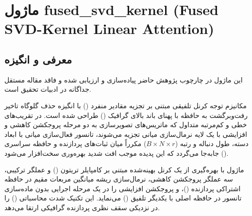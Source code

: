 \section{ماژول fused\_svd\_kernel (Fused SVD-Kernel Linear Attention)}
\label{sec:module_fused_svd_kernel}

\subsection{معرفی و انگیزه}
این ماژول در چارچوب پژوهش حاضر پیاده‌سازی و ارزیابی شده و فاقد مقاله مستقل جداگانه در ادبیات تحقیق است.

مکانیزم توجه کرنل تلفیقی مبتنی بر تجزیه مقادیر منفرد () با انگیزه حذف گلوگاه تاخیر رفت‌وبرگشت به حافظه با پهنای باند بالای گرافیک () طراحی شده است. در تقریب‌های خطی و کم‌مرتبه متداول که ماتریس‌های تصویرسازی به دو مرحله پروجکشن کاهشی و افزایشی با یک لایه نرمال‌سازی میانی تجزیه می‌شوند، تانسور فعال‌سازی میانی با ابعاد دسته، طول دنباله و رتبه ($B \times N \times r$) مکرراً میان ثبات‌های پردازنده و حافظه سراسری () جابه‌جا می‌گردد که این پدیده موجب افت شدید بهره‌وری سخت‌افزار می‌شود.

ماژول  با بهره‌گیری از یک کرنل بهینه‌شده مبتنی بر کامپایلر تریتون () و عملگر ترکیبی، سه عملگر پروجکشن کاهشی، نرمال‌سازی ریشه میانگین مربعات مقیم در حافظه اشتراکی پردازنده ()، و پروجکشن افزایشی را در یک مرحله اجرایی بدون ماده‌سازی تانسور در حافظه اصلی با یکدیگر تلفیق () می‌نماید. این تکنیک شدت محاسباتی () را در نزدیکی سقف نظری پردازنده گرافیکی ارتقا می‌دهد.

